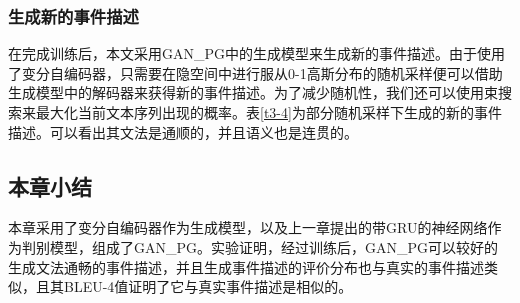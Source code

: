 \subsubsection{生成新的事件描述}
在完成训练后，本文采用GAN\_PG中的生成模型来生成新的事件描述。由于使用了变分自编码器，只需要在隐空间中进行服从0-1高斯分布的随机采样便可以借助生成模型中的解码器来获得新的事件描述。为了减少随机性，我们还可以使用束搜索来最大化当前文本序列出现的概率。表\ref{t3-4}为部分随机采样下生成的新的事件描述。可以看出其文法是通顺的，并且语义也是连贯的。

\subsection{本章小结}
本章采用了变分自编码器作为生成模型，以及上一章提出的带GRU的神经网络作为判别模型，组成了GAN\_PG。实验证明，经过训练后，GAN\_PG可以较好的生成文法通畅的事件描述，并且生成事件描述的评价分布也与真实的事件描述类似，且其BLEU-4值证明了它与真实事件描述是相似的。

